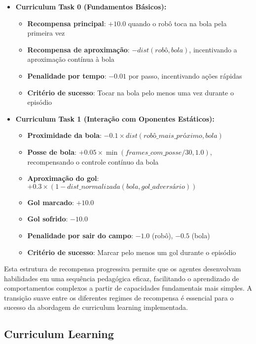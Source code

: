 \begin{itemize}
    \item \textbf{Curriculum Task 0 (Fundamentos Básicos):}
    \begin{itemize}
        \item \textbf{Recompensa principal}: $+10.0$ quando o robô toca na bola pela primeira vez
        \item \textbf{Recompensa de aproximação}: $-dist(robô, bola)$, incentivando a aproximação contínua à bola
        \item \textbf{Penalidade por tempo}: $-0.01$ por passo, incentivando ações rápidas
        \item \textbf{Critério de sucesso}: Tocar na bola pelo menos uma vez durante o episódio
    \end{itemize}
    
    \item \textbf{Curriculum Task 1 (Interação com Oponentes Estáticos):}
    \begin{itemize}
        \item \textbf{Proximidade da bola}: $-0.1 \times dist(robô\_mais\_próximo, bola)$
        \item \textbf{Posse de bola}: $+0.05 \times \min(frames\_com\_posse / 30, 1.0)$, recompensando o controle contínuo da bola
        \item \textbf{Aproximação do gol}: $+0.3 \times (1 - dist\_normalizada(bola, gol\_adversário))$
        \item \textbf{Gol marcado}: $+10.0$
        \item \textbf{Gol sofrido}: $-10.0$
        \item \textbf{Penalidade por sair do campo}: $-1.0$ (robô), $-0.5$ (bola)
        \item \textbf{Critério de sucesso}: Marcar pelo menos um gol durante o episódio
    \end{itemize}
\end{itemize}

Esta estrutura de recompensa progressiva permite que os agentes desenvolvam habilidades em uma sequência pedagógica eficaz, facilitando o aprendizado de comportamentos complexos a partir de capacidades fundamentais mais simples. A transição suave entre os diferentes regimes de recompensa é essencial para o sucesso da abordagem de curriculum learning implementada.

\subsection{Curriculum Learning}

